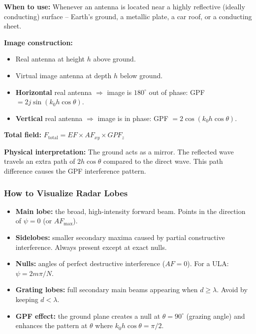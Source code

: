 \documentclass[10pt,letterpaper]{article}
\newcommand{\degrees}{^{\circ}}
\begin{document}
\begin{tcolorbox}[formulabox, title={Image Theory \& When to Apply It}]
\textbf{When to use:} Whenever an antenna is located near a highly reflective (ideally conducting) surface -- Earth's ground, a metallic plate, a car roof, or a conducting sheet.

\textbf{Image construction:}
\begin{itemize}[noitemsep]
  \item Real antenna at height $h$ above ground.
  \item Virtual image antenna at depth $h$ below ground.
  \item \textbf{Horizontal} real antenna $\Rightarrow$ image is $180\degrees$ out of phase: GPF $= 2j\sin(k_0 h\cos\theta)$.
  \item \textbf{Vertical} real antenna $\Rightarrow$ image is in phase: GPF $= 2\cos(k_0 h\cos\theta)$.
\end{itemize}
\textbf{Total field:} $F_\mathrm{total} = EF\times AF_{xy}\times GPF_z$

\textbf{Physical interpretation:} The ground acts as a mirror. The reflected wave travels an extra path of $2h\cos\theta$ compared to the direct wave. This path difference causes the GPF interference pattern.
\end{tcolorbox}

\subsubsection{How to Visualize Radar Lobes}
\begin{itemize}[noitemsep]
  \item \textbf{Main lobe:} the broad, high-intensity forward beam. Points in the direction of $\psi=0$ (or $AF_\mathrm{max}$).
  \item \textbf{Sidelobes:} smaller secondary maxima caused by partial constructive interference. Always present except at exact nulls.
  \item \textbf{Nulls:} angles of perfect destructive interference ($AF=0$). For a ULA: $\psi = 2m\pi/N$.
  \item \textbf{Grating lobes:} full secondary main beams appearing when $d\geq\lambda$. Avoid by keeping $d < \lambda$.
  \item \textbf{GPF effect:} the ground plane creates a null at $\theta=90\degrees$ (grazing angle) and enhances the pattern at $\theta$ where $k_0h\cos\theta = \pi/2$.
\end{itemize}
\end{document}
